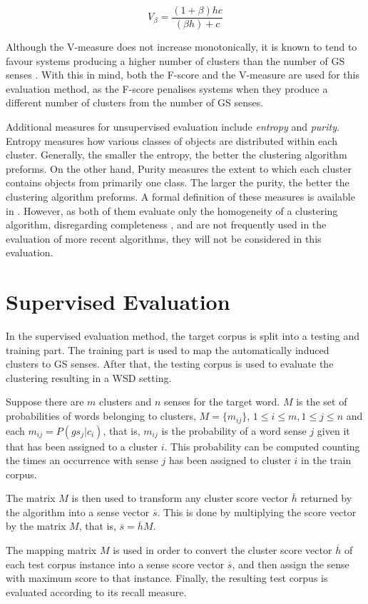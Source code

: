 \begin{equation} \label{eq:vmes}
 V_\beta = \frac{(1+\beta)hc}{(\beta h) + c}
\end{equation}

Although the V-measure does not increase monotonically, it is known to tend to
favour systems producing a higher number of clusters than the number of \ac{GS}
senses \cite{manandhar2010semeval}. With this in mind, both the F-score and the
V-measure are used for this evaluation method, as the F-score penalises systems
when they produce a different number of clusters from the number of \ac{GS}
senses.

Additional measures for unsupervised evaluation include \textit{entropy} and
\textit{purity}. Entropy measures how various classes of objects are
distributed within each cluster. Generally, the smaller the entropy, the better
the clustering algorithm preforms. On the other hand, Purity measures the extent
to which each cluster contains objects from primarily one class. The larger the
purity, the better the clustering algorithm preforms. A formal definition of
these measures is available in \cite{zhao2005hierarchical}. However, as both of
them evaluate only the homogeneity of a clustering algorithm, disregarding
completeness \cite{manandhar2009semeval}, and are not frequently used in the
evaluation of more recent algorithms, they will not be considered in this
evaluation.

\section{Supervised Evaluation}
\label{sec:supeval}

In the supervised evaluation method, the target corpus is split into a testing
and training part. The training part is used to map the automatically induced
clusters to \ac{GS} senses. After that, the testing corpus is used to evaluate
the clustering resulting in a \ac{WSD} setting.

Suppose there are $m$ clusters and $n$ senses for the target word. $M$ is the
set of probabilities of words belonging to clusters, $M = \{m_{ij}\}$, $1 \leq i
\leq m, 1 \leq j \leq n$ and each $m_{ij} = P(gs_j|c_i)$, that is, $m_{ij}$ is
the probability of a word sense $j$ given it that has been assigned to a cluster
$i$. This probability can be computed counting the times an occurrence with
sense $j$ has been assigned to cluster $i$ in the train corpus.

The matrix $M$ is then used to transform any cluster score vector $\overline{h}$
returned by the algorithm into a sense vector $\overline{s}$. This is done by
multiplying the score vector by the matrix $M$, that is, $\overline{s} =
\overline{h}M$.

The mapping matrix $M$ is used in order to convert the cluster score vector
$\overline{h}$ of each test corpus instance into a sense score vector
$\overline{s}$, and then assign the sense with maximum score to that instance.
Finally, the resulting test corpus is evaluated according to its recall measure.

